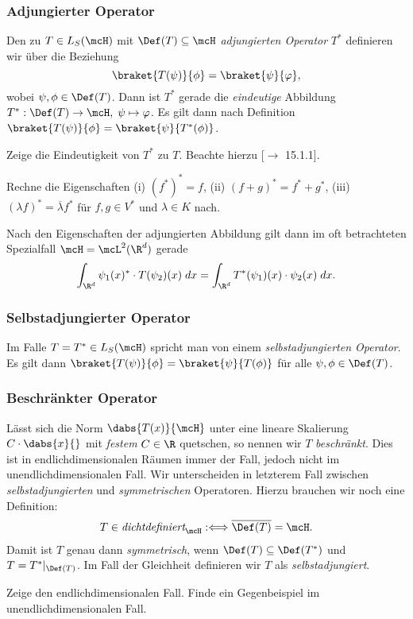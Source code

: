 \documentclass{subfiles}
\begin{document}
        \subsubsection*{Adjungierter Operator}
            Den zu $T\in L_S(\mcH)$ mit $\Def(T)\subseteq\mcH$ \emph{adjungierten Operator} $T^*$ definieren wir über die Beziehung 
            \[\braket{T(\psi)}{\phi} = \braket{\psi}{\varphi},\]
            wobei $\psi,\phi\in\Def(T)$. Dann ist $T^*$ gerade die \emph{eindeutige} Abbildung $T^*:\Def(T)\to\mcH,\;\psi\mapsto \varphi$. Es gilt dann nach Definition $\braket{T(\psi)}{\phi} = \braket{\psi}{T^*(\phi)}$.
            \begin{Aufgabe}
                \nr{} Zeige die Eindeutigkeit von $T^*$ zu $T$. Beachte hierzu [$\to$ 15.1.1]. 

                \nr{} Rechne die Eigenschaften (i) $(f^*)^* = f$, (ii) $(f + g)^* = f^* + g^*$, (iii) $(\lambda f)^* = \overline{\lambda}f^*$ für $f,g\in V^*$ und $\lambda\in K$ nach.
            \end{Aufgabe}
            Nach den Eigenschaften der adjungierten Abbildung gilt dann im oft betrachteten Spezialfall $\mcH = \mcL^2(\R^d)$ gerade
            \[
                \int_{\R^d} \psi_1(x)^*\cdot T(\psi_2)(x)\;dx = \int_{\R^d} T^*(\psi_1)(x)\cdot\psi_2(x)\;dx.
            \]

        \subsubsection*{Selbstadjungierter Operator}
            Im Falle $T = T^* \in L_S(\mcH)$ spricht man von einem \emph{selbstadjungierten Operator}. Es gilt dann $\braket{T(\psi)}{\phi} = \braket{\psi}{T(\phi)}$ für alle $\psi,\phi\in\Def(T)$. 

        \subsubsection*{Beschränkter Operator}
            Lässt sich die Norm $\dabs{T(x)}{\mcH}$ unter eine lineare Skalierung $C\cdot\dabs{x}{}$ mit \emph{festem} $C\in\R$ quetschen, so nennen wir $T$ \emph{beschränkt}. Dies ist in endlichdimensionalen Räumen immer der Fall, jedoch nicht im unendlichdimensionalen Fall. Wir unterscheiden in letzterem Fall zwischen \emph{selbstadjungierten} und \emph{symmetrischen} Operatoren. Hierzu brauchen wir noch eine Definition:
            \begin{align*}
                T\in\textit{dichtdefiniert}_\mcH:\Longleftrightarrow \overline{\Def(T)} = \mcH.
            \end{align*}
            Damit ist $T$ genau dann \emph{symmetrisch}, wenn $\Def(T)\subseteq\Def(T^*)$ und $T = T^*|_{\Def(T)}$. Im Fall der Gleichheit definieren wir $T$ als \emph{selbstadjungiert}.
            \begin{Aufgabe}
                \nr{} Zeige den endlichdimensionalen Fall. Finde ein Gegenbeispiel im unendlichdimensionalen Fall. 
            \end{Aufgabe}
\end{document}

